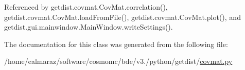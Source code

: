 Referenced by getdist.\+covmat.\+Cov\+Mat.\+correlation(), getdist.\+covmat.\+Cov\+Mat.\+load\+From\+File(), getdist.\+covmat.\+Cov\+Mat.\+plot(), and getdist.\+gui.\+mainwindow.\+Main\+Window.\+write\+Settings().



The documentation for this class was generated from the following file\+:\begin{DoxyCompactItemize}
\item 
/home/ealmaraz/software/cosmomc/bde/v3./python/getdist/\mbox{\hyperlink{covmat_8py}{covmat.\+py}}\end{DoxyCompactItemize}
